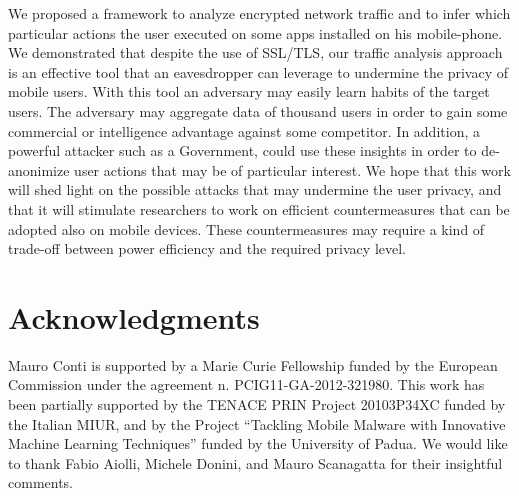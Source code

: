 \documentclass{acm_proc_article-sp}
\newcommand{\hilight}[1]{#1}
\begin{document}
We proposed a framework to analyze encrypted network traffic and to infer which particular actions the 
user executed on some apps installed on his mobile-phone. 
\hilight{We demonstrated that despite the use of SSL/TLS, our traffic analysis 
approach is an effective tool that an eavesdropper 
can leverage to undermine the privacy of mobile users. 
With this tool an adversary may easily learn habits of the target users. The adversary may aggregate
data of thousand users in order to gain some commercial or intelligence advantage against some competitor. In addition, a powerful attacker such as a Government, could use these insights in order to de-anonimize user actions that may be of particular interest.}
We hope that this work will \hilight{shed light on} the possible attacks that may undermine the 
user privacy, and that it will stimulate researchers to work on efficient countermeasures that can be
adopted also on mobile devices. These countermeasures may require a kind of trade-off between 
power efficiency and the required privacy level.






\section{Acknowledgments}
  \label{Acknowledgement}
\hilight{Mauro Conti is supported by a Marie Curie Fellowship funded by the
European Commission under the agreement n. PCIG11-GA-2012-321980.
This work has been partially supported by the TENACE PRIN Project
20103P34XC funded by the Italian MIUR, and by the Project ``Tackling
Mobile Malware with Innovative Machine Learning Techniques'' funded by
the University of Padua.}
  We would like to thank Fabio Aiolli, Michele Donini, and Mauro Scanagatta for their insightful comments.



\balance

\end{document}
